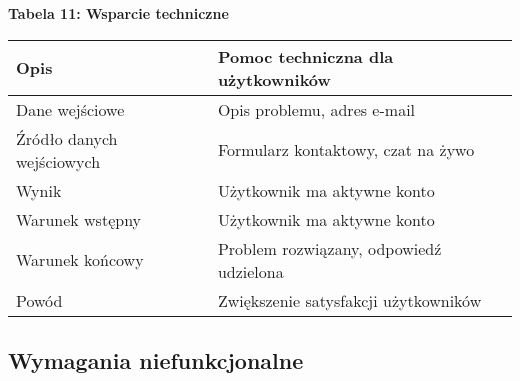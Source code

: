 \newpage

\textbf{Tabela 11: Wsparcie techniczne}
\begin{table}[h]
  \begin{tabular}{|p{3cm}|p{\dimexpr\textwidth-3cm\relax}|} \hline
    Opis & Pomoc techniczna dla użytkowników \\\hline
    Dane wejściowe & Opis problemu, adres e-mail \\\hline
    Źródło danych wejściowych & Formularz kontaktowy, czat na żywo \\\hline
    Wynik & Użytkownik ma aktywne konto \\\hline
    Warunek wstępny & Użytkownik ma aktywne konto \\\hline
    Warunek końcowy & Problem rozwiązany, odpowiedź udzielona \\\hline
    Powód & Zwiększenie satysfakcji użytkowników \\\hline
  \end{tabular}
\end{table}

\newpage

\begin{center}
  \subsection{Wymagania niefunkcjonalne}
\end{center}

